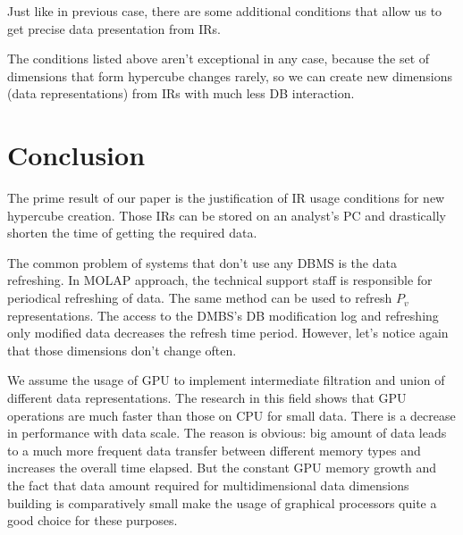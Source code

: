 \documentclass[10pt,a4paper]{article}
\begin{document}


Just like in previous case, there are some additional conditions that allow us to get precise data presentation from IRs.



The conditions listed above aren't exceptional in any case, because the set of dimensions that form hypercube changes rarely, so we can create new dimensions (data representations) from IRs with much less DB interaction.

\section{Conclusion}
The prime result of our paper is the justification of IR usage conditions for
new hypercube creation. Those IRs can be stored on an analyst's PC and
drastically shorten the time of getting the required data.

The common problem of systems that don't use any DBMS is the data refreshing. In
MOLAP approach, the technical support staff is responsible for periodical
refreshing of data. The same method can be used to refresh $P_v$
representations. The access to the DMBS's DB modification log and refreshing
only modified data decreases the refresh time period. However, let's notice
again that those dimensions don't change often.

We assume the usage of GPU to implement intermediate filtration and union of
different data representations. The research in this field shows that GPU
operations are much faster than those on CPU for small data. There is a decrease
in performance with data scale. The reason is obvious: big amount of data leads
to a much more frequent data transfer between different memory types and
increases the overall time elapsed. But the constant GPU memory growth and the
fact that data amount required for multidimensional data dimensions building is
comparatively small make the usage of graphical processors quite a good choice
for these purposes.

\end{document}
